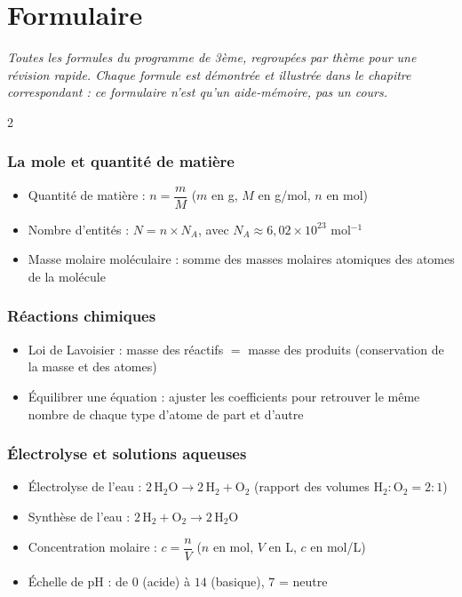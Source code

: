 \chapter{Formulaire}

\noindent\textit{Toutes les formules du programme de 3ème, regroupées par thème pour une
révision rapide. Chaque formule est démontrée et illustrée dans le chapitre correspondant :
ce formulaire n'est qu'un aide-mémoire, pas un cours.}
\vspace{8pt}

\begin{multicols}{2}

\subsection*{\color{onbo}La mole et quantité de matière}
\begin{itemize}
\item Quantité de matière : $n=\dfrac mM$ ($m$ en g, $M$ en g/mol, $n$ en mol)
\item Nombre d'entités : $N=n\times N_A$, avec $N_A\approx6{,}02\times10^{23}$ mol$^{-1}$
\item Masse molaire moléculaire : somme des masses molaires atomiques des atomes de la
molécule
\end{itemize}

\subsection*{\color{onbo}Réactions chimiques}
\begin{itemize}
\item Loi de Lavoisier : masse des réactifs $=$ masse des produits (conservation de la
masse et des atomes)
\item Équilibrer une équation : ajuster les coefficients pour retrouver le même nombre de
chaque type d'atome de part et d'autre
\end{itemize}

\subsection*{\color{onbo}Électrolyse et solutions aqueuses}
\begin{itemize}
\item Électrolyse de l'eau : $2\,\mathrm{H_2O}\longrightarrow2\,\mathrm{H_2}+\mathrm{O_2}$
(rapport des volumes $\mathrm{H_2}:\mathrm{O_2}=2:1$)
\item Synthèse de l'eau : $2\,\mathrm{H_2}+\mathrm{O_2}\longrightarrow2\,\mathrm{H_2O}$
\item Concentration molaire : $c=\dfrac nV$ ($n$ en mol, $V$ en L, $c$ en mol/L)
\item Échelle de pH : de $0$ (acide) à $14$ (basique), $7$ = neutre
\end{itemize}


\end{multicols}
